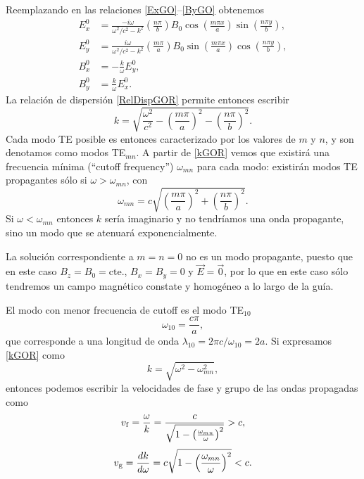Reemplazando en las relaciones \eqref{ExGO}--\eqref{ByGO} obtenemos
\begin{align}
    E^0_x &= \frac{-i\omega}{\omega^2/c^2 - k^2}\left(\frac{n \pi}{b}\right)  B_0\cos\left(\frac{m \pi x}{a}\right) \sin\left(\frac{n \pi y}{b}\right), \label{ExGOTE}\\
    E^0_y &= \frac{i\omega}{\omega^2/c^2 - k^2}\left(\frac{m \pi}{a}\right)  B_0\sin\left(\frac{m \pi x}{a}\right) \cos\left(\frac{n \pi y}{b}\right), \label{EyGOTE}\\
    B^0_x &= -\frac{k}{\omega}E^0_y, \label{BxGOTE}\\
    B^0_y &= \frac{k}{\omega}E^0_x. \label{ByGOTE}
\end{align}
La relación de dispersión \eqref{RelDispGOR} permite entonces escribir
\begin{equation}\label{kGOR}
k = \sqrt{\frac{\omega^2}{c^2} - \left(\frac{m \pi}{a}\right)^2 - \left(\frac{n \pi}{b}\right)^2}.
\end{equation}
Cada modo TE posible es entonces caracterizado por los valores de $m$ y $n$, y son denotamos como modos TE$_{mn}$. A partir de \eqref{kGOR} vemos que existirá una frecuencia mínima (``cutoff frequency'') $\omega_{mn}$ para cada modo: existirán modos TE propagantes sólo si $\omega>\omega_{mn}$, con
\begin{equation}
\omega_{mn} = c \sqrt{\left(\frac{m \pi}{a}\right)^2 + \left(\frac{n \pi}{b}\right)^2}.
\end{equation}
Si $\omega<\omega_{mn}$ entonces $k$ sería imaginario y no tendríamos una onda propagante, sino un modo que se atenuará exponencialmente.

La solución correspondiente a $m=n=0$ no es un modo propagante, puesto que en este caso $B_z=B_0=\text{cte.}$, $B_x=B_y=0$ y $\vec{E}=\vec{0}$, por lo que en este caso sólo tendremos un campo magnético constate y homogéneo a lo largo de la guía.

 El modo con menor frecuencia de cutoff es el modo TE$_{10}$
\begin{equation}
\omega_{10} = \frac{c \pi}{a},
\end{equation}
que corresponde a una longitud de onda $\lambda_{10}=2\pi c/\omega_{10}=2a$.
Si expresamos \eqref{kGOR} como
\begin{equation}
k = \sqrt{\omega^2 - \omega_{mn}^2},
\end{equation}
entonces podemos escribir la velocidades de fase y grupo de las ondas propagadas como
\begin{equation}
v_{\rm f} = \frac{\omega}{k} = \frac{c}{\sqrt{1 - \left(\frac{\omega_{mn}}{\omega}\right)^2}} > c,
\end{equation}
\begin{equation}
v_{\rm g} = \frac{dk}{d\omega} = c \sqrt{1 - \left(\frac{\omega_{mn}}{\omega}\right)^2} < c.
\end{equation}


